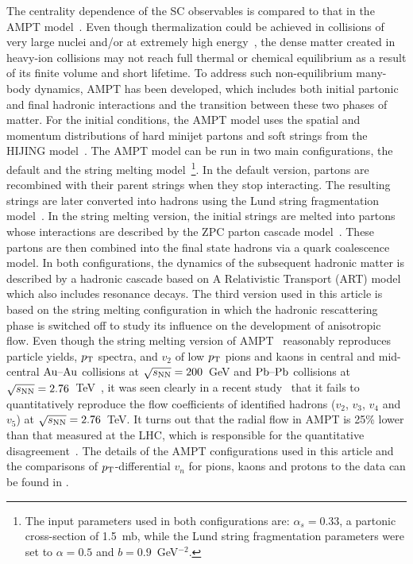 The centrality dependence of the SC observables is compared to that in the {AMPT} model~\cite{Zhang:1999bd,Lin:2000cx,Lin:2004en}.
Even though thermalization could be achieved in collisions of very large nuclei and/or at extremely high energy~\cite{Kurkela:2015qoa}, the dense matter created in heavy-ion collisions may not reach full thermal or chemical equilibrium as a result of its finite volume and short lifetime. To address such non-equilibrium many-body dynamics, AMPT has been developed, which includes both initial partonic and final hadronic interactions and the transition between these two phases of matter.
For the initial conditions, the AMPT model uses the spatial and momentum distributions of hard minijet partons and soft strings from the HIJING model~\cite{Wang:1991hta,Gyulassy:1994ew}.
The AMPT model can be run in two main configurations, the default and the string melting model~\footnote{The input parameters used in both configurations are: $\alpha_s = 0.33$, a partonic cross-section of 1.5~mb, while the Lund string fragmentation parameters were set to $\alpha = 0.5$ and $b = 0.9$~GeV$^{-2}$.}.
In the default version, partons are recombined with their parent strings when they stop interacting. The resulting strings are later converted into hadrons using the Lund string fragmentation model~\cite{Andersson:1986gw,NilssonAlmqvist:1986rx}. In the string melting version, the initial strings are melted into partons whose interactions are described by the ZPC parton cascade model~\cite{Zhang:1997ej}. These partons are then combined into the final state hadrons via a quark coalescence model. 
In both configurations, the dynamics of the subsequent hadronic matter is described by a hadronic cascade based on A Relativistic Transport (ART) model~\cite{Li:2001xh} which also includes resonance decays.
The third version used in this article is based on the string melting configuration in which the hadronic rescattering phase is switched off to study its influence on the development of anisotropic flow. 
Even though the string melting version of AMPT~\cite{Lin:2001zk,Lin:2004en} reasonably reproduces particle yields, $p_{\rm T}$ spectra, and $v_2$ of low $p_{\rm T}$ pions and kaons in central and mid-central $\textnormal{Au--Au}$ collisions at $\sqrt{s_{\textnormal{NN}}}=200$~GeV and $\textnormal{Pb--Pb}$ collisions at $\sqrt{s_{\textnormal{NN}}}=2.76$~TeV~\cite{Lin:2014tya}, it was seen clearly in a recent study~\cite{Adam:2016nfo} that it fails to quantitatively reproduce the flow coefficients of identified hadrons ($v_2$, $v_3$, $v_4$ and $v_5$) at $\sqrt{s_{\textnormal{NN}}}=2.76$~TeV. It turns out that the radial flow in AMPT is 25\% lower than that measured at the LHC, which is responsible for the quantitative disagreement~\cite{Adam:2016nfo}. The details of the AMPT configurations used in this article and the comparisons of $p_{\rm T}$-differential $v_{n}$ for pions, kaons and protons to the data can be found in \cite{Adam:2016nfo}.

